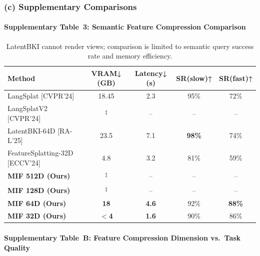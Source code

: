 \documentclass[10pt,a4paper]{article}
\newcommand{\oom}{\textsuperscript{‡}}
\begin{document}
\subsubsection*{(c) Supplementary Comparisons}

\paragraph{Supplementary Table~3: Semantic Feature Compression Comparison}
\begin{table}[h]
\centering\small
\begin{tabular}{lcccc}
\toprule
\textbf{Method} & \textbf{VRAM↓ (GB)} & \textbf{Latency↓ (s)} & \textbf{SR(slow)↑} & \textbf{SR(fast)↑}\\
\midrule
LangSplat {[}CVPR'24{]} & 18.45 & 2.3 & 95\% & 72\%\\
LangSplatV2 {[}CVPR'24{]} & \oom & -- & -- & --\\
LatentBKI-64D {[}RA-L'25{]} & 23.5 & 7.1 & \textbf{98\%} & 74\%\\
FeatureSplatting-32D {[}ECCV'24{]} & 4.8 & 3.2 & 81\% & 59\%\\
\textbf{MIF 512D (Ours)} & \oom & -- & -- & --\\
\textbf{MIF 128D (Ours)} & \oom & -- & -- & --\\
\textbf{MIF 64D (Ours)} & \textbf{18} & \textbf{4.6} & 92\% & \textbf{88\%}\\
\textbf{MIF 32D (Ours)} & \textbf{$<$4} & \textbf{1.6} & 90\% & 86\%\\
\bottomrule
\end{tabular}
\caption{\small LatentBKI cannot render views; comparison is limited to semantic query success rate and memory efficiency.}
\end{table}

\paragraph{Supplementary Table~B: Feature Compression Dimension vs.\ Task Quality}
\end{document}
